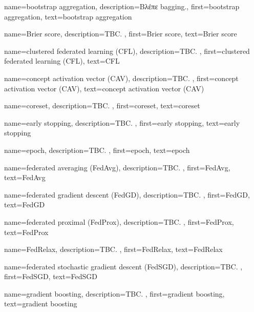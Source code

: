 {name={bootstrap aggregation}, 
	description={\foreignlanguage{greek}{Βλέπε} \gls{bagging}.},
 	first={bootstrap aggregation},
 	text={bootstrap aggregation} 
}%

{name={Brier score},
	description={TBC. },
	first={Brier score},
	text={Brier score}
}

{name={clustered federated learning (CFL)}, 
	description={TBC. }, 
	first={clustered federated learning (CFL)},
	text={CFL} 
}%

{name={concept activation vector (CAV)},
	description={TBC. }, 
	first={concept activation vector (CAV)},
	text={concept activation vector (CAV)}
}%

{name={coreset}, 
	description={TBC. },
	first={coreset},
	text={coreset} 
}

{name={early stopping}, 
	description={TBC. },
	first={early stopping},
	text={early stopping}
}

{name={epoch},
	description={TBC. },
	first={epoch},
	text={epoch}
}

{name={federated averaging (FedAvg)},
	description={TBC. },
	first={FedAvg},
	text={Fed\-Avg}
} 

{name={federated gradient descent (FedGD)},
	description={TBC. },
	first={FedGD},
	text={FedGD}
} 

{name={federated proximal (FedProx)},
	description={TBC. }, 
	first={FedProx}, 
	text={FedProx} 
}

{name={FedRelax},
	description={TBC. },
	first={FedRelax},
	text={FedRelax}
} 

{name={federated stochastic gradient descent (FedSGD)},
	description={TBC. },
	first={FedSGD},
	text={FedSGD}
}

{name={gradient boosting},
 	description={TBC. },
 	first={gradient boosting}, 
 	text={gradient boosting}
}

